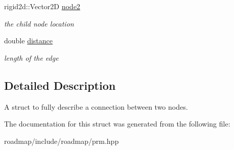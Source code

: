 \begin{DoxyCompactItemize}
\mbox{\label{structprm_1_1Edge_a3d555282fbb49f6cbaa37865ae09029c}} 
rigid2d\+::\+Vector2D \hyperlink{structprm_1_1Edge_a3d555282fbb49f6cbaa37865ae09029c}{node2}
\begin{DoxyCompactList}\small\item\em the child node location \end{DoxyCompactList}\item 
\mbox{\label{structprm_1_1Edge_a7f65f07649f06a87bc16514c75b9feb2}} 
double \hyperlink{structprm_1_1Edge_a7f65f07649f06a87bc16514c75b9feb2}{distance}
\begin{DoxyCompactList}\small\item\em length of the edge \end{DoxyCompactList}\end{DoxyCompactItemize}


\subsection{Detailed Description}
A struct to fully describe a connection between two nodes. 

The documentation for this struct was generated from the following file\+:\begin{DoxyCompactItemize}
\item 
roadmap/include/roadmap/prm.\+hpp\end{DoxyCompactItemize}
